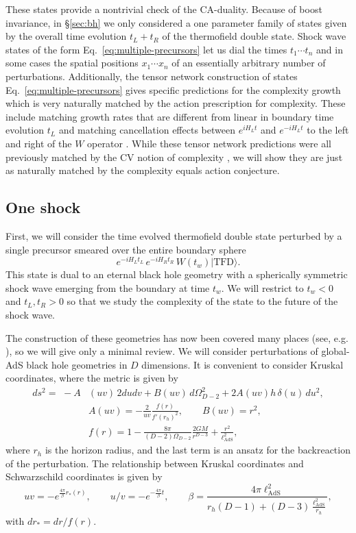 \documentclass[12pt]{article}
\numberwithin{equation}{section}
\newcommand{\be}{\begin{equation}}
\newcommand{\ee}{\end{equation}}
\newcommand{\TFD}{|\text{TFD}\rangle}
\newcommand{\lads}{\ell_{\text{AdS}}}
\renewcommand{\eqref}[1]{Eq.~\ref{#1}}
\begin{document}
These states provide a nontrivial check of the CA-duality. Because of boost invariance, in \S\ref{sec:bh} we only considered a one parameter family of states given by the overall time evolution $t_L + t_R$ of the thermofield double state. Shock wave states of the form \eqref{eq:multiple-precursors} let us dial the times $t_1 \cdots t_n$ and in some cases the spatial positions $x_1 \cdots x_n$ of an essentially arbitrary number of perturbations. Additionally, the tensor network construction of states \eqref{eq:multiple-precursors} gives specific predictions for the complexity growth \cite{localshocks} which is very naturally matched by the action prescription for complexity. These include matching growth rates that are different from linear in boundary time evolution $t_L$ \cite{localshocks} and matching cancellation effects between $e^{i H_L t}$ and $e^{-i H_L t}$ to the left and right of the $W$ operator \cite{complexityshocks}. While these tensor network predictions were all previously matched by the CV notion of complexity \cite{localshocks,complexityshocks,Susskind:2014jwa}, we will show they are just as naturally matched by the complexity equals action conjecture.


\subsection{One shock}\label{sec:one-shock}
First, we will consider the time evolved thermofield double state perturbed by a single precursor smeared over the entire boundary sphere
\be
e^{-i H_L t_L}\, e^{-i H_R t_R}\, W(t_w) \TFD. \label{eq:sinlge-precursors}
\ee
This state is dual to an eternal black hole geometry with a spherically symmetric shock wave emerging from the boundary at time $t_w$.
We will restrict to $t_w < 0$ and $t_L, t_R > 0$ so that we study the complexity of the state to the future of the shock wave.

The construction of these geometries has now been covered many places (see, e.g. \cite{localshocks}), so we will give only a minimal review. We will consider perturbations of global-AdS black hole geometries in $D$  dimensions. It is convenient to consider Kruskal coordinates, where the metric is given by
\begin{align}
ds^2 =\,\,-A&(uv) \, 2du dv + B(uv)\, d\Omega_{D-2}^2 + 2A(uv)h\,\delta(u) \, du^2, \\
&A(uv) = -\frac{2}{uv}\frac{f(r)}{f'(r_h)^2}, \qquad B(uv) = r^2, \\
&f(r) = 1 - \frac{8 \pi}{(D-2)\Omega_{D-2}} \frac{2 G M}{r^{D-3}} + \frac{r^2}{\lads^2}, \label{eq:metric-one-shock}
\end{align}
where $r_h$ is the horizon radius, and the last term is an ansatz for the backreaction of the perturbation.
The relationship between Kruskal coordinates and Schwarzschild coordinates is given by
\be
uv = - e^{\frac{4\pi}{\beta}r_*(r)}, \qquad u/v = - e^{-\frac{4\pi}{\beta} t}, \qquad \beta = \frac{4\pi \lads^2}{r_h (D-1) + (D-3)\frac{\lads^2}{r_h} },
\ee
with $dr_* = dr / f(r)$.
\end{document}
